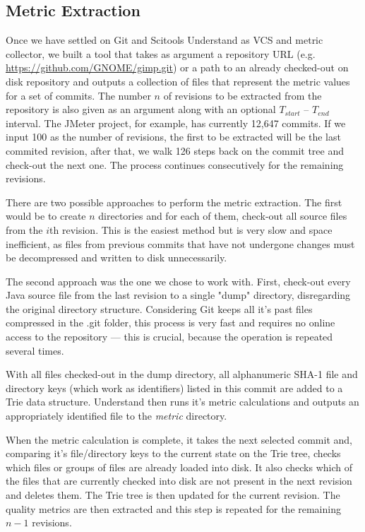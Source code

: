 \subsection{Metric Extraction} \label{sec:extraction}
Once we have settled on Git and Scitools Understand as VCS and metric collector, we built a tool that takes as argument a repository URL (e.g. \url{https://github.com/GNOME/gimp.git}) or a path to an already checked-out on disk repository and outputs a collection of files that represent the metric values for a set of commits. The number $n$ of revisions to be extracted from the repository is also given as an argument along with an optional $T_{start}$ -- $T_{end}$ interval. The JMeter project, for example, has currently 12,647 commits. If we input 100 as the number of revisions, the first to be extracted will be the last commited revision, after that, we walk 126 steps back on the commit tree and check-out the next one. The process continues consecutively for the remaining revisions.

There are two possible approaches to perform the metric extraction. The first would be to create $n$ directories and for each of them, check-out all source files from the $i$th revision. This is the easiest method but is very slow and space inefficient, as files from previous commits that have not undergone changes must be decompressed and written to disk unnecessarily.

The second approach was the one we chose to work with. First, check-out every Java source file from the last revision to a single "dump" directory, disregarding the original directory structure. Considering Git keeps all it's past files compressed in the .git folder, this process is very fast and requires no online access to the repository --- this is crucial, because the operation is repeated several times.

With all files checked-out in the dump directory, all alphanumeric SHA-1 file and directory keys (which work as identifiers) listed in this commit are added to a Trie data structure. Understand then runs it's metric calculations and outputs an appropriately identified file to the \textit{metric} directory.

When the metric calculation is complete, it takes the next selected commit and, comparing it's file/directory keys to the current state on the Trie tree, checks which files or groups of files are already loaded into disk. It also checks which of the files that are currently checked into disk are not present in the next revision and deletes them. The Trie tree is then updated for the current revision. The quality metrics are then extracted and this step is repeated for the remaining $n-1$ revisions.

